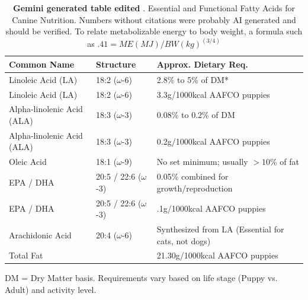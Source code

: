 \begin{table}[htp]
\centering
\caption{ \textbf{Gemini generated table edited} . Essential and Functional Fatty Acids for Canine Nutrition. Numbers without citations were probably AI generated and should be verified. To relate metabolizable energy to body weight, a formula such as $ .41=ME(MJ)/BW(kg)^{(3/4)} $ \cite{Thes_Koeber_Fritz_Metabolizable_energy_intake_2015}}
\vspace{2pt}
\begin{tabularx}{\textwidth}{l l X}
\toprule
\textbf{Common Name} & \textbf{Structure } & \textbf{Approx. Dietary Req.} \\ 
\midrule
Linoleic Acid (LA) & 18:2  ($\omega$-6) \cite{Ozbay_Determination_fatty_acid_2026} & 2.8\% to 5\% of DM* \\ 
Linoleic Acid (LA) & 18:2  ($\omega$-6) \cite{Ozbay_Determination_fatty_acid_2026} & 3.3g/1000kcal AAFCO puppies   \cite{Cho_Lee_Lee_Nutritional_Evaluation_Commercial_2026} \\ 
\addlinespace
Alpha-linolenic Acid (ALA) & 18:3  ($\omega$-3)   & 0.08\% to 0.2\% of DM \\ 
Alpha-linolenic Acid (ALA) & 18:3  ($\omega$-3)   &  0.2g/1000kcal AAFCO puppies \cite{Cho_Lee_Lee_Nutritional_Evaluation_Commercial_2026} \\ 
\addlinespace
Oleic Acid & 18:1 ($\omega$-9) \cite{Ozbay_Determination_fatty_acid_2026} & No set minimum; usually $>10\%$ of fat \\ 
\addlinespace
EPA / DHA & 20:5 / 22:6 ($\omega$-3) & 0.05\% combined for growth/reproduction \\ 
EPA / DHA & 20:5 / 22:6 ($\omega$-3) &  .1g/1000kcal AAFCO puppies \cite{Cho_Lee_Lee_Nutritional_Evaluation_Commercial_2026} \\ 
\addlinespace
Arachidonic Acid & 20:4  ($\omega$-6) & Synthesized from LA (Essential for cats, not dogs) \\
\addlinespace
Total Fat  & & 21.30g/1000kcal AAFCO puppies  \cite{Cho_Lee_Lee_Nutritional_Evaluation_Commercial_2026} \\

\bottomrule
\end{tabularx}

{ \raggedright   \small *DM = Dry Matter basis. Requirements vary based on life stage (Puppy vs. Adult) and activity level.}
\end{table}



